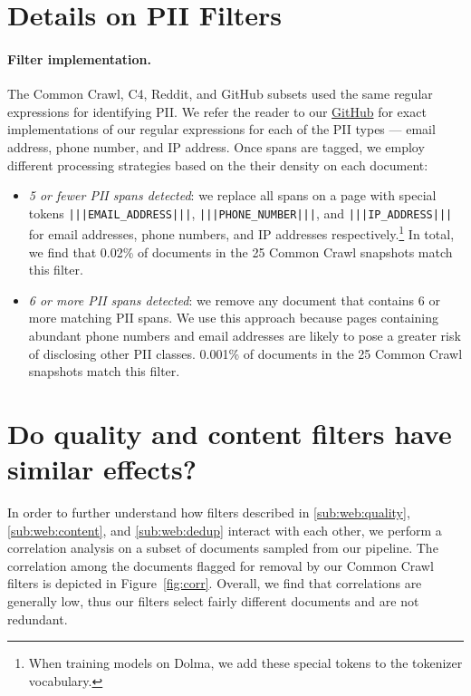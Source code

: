 \documentclass{article}
\newcommand{\dolma}{Dolma\xspace}
\begin{document}
\section{Details on PII Filters}
\label{app:pii-filter-details}

\paragraph{Filter implementation.} The Common Crawl, C4, Reddit, and GitHub subsets used the same regular expressions for identifying PII.
We refer the reader to our \href{https://anonymous.4open.science/r/dolma-55C2/}{GitHub} for exact implementations of our regular expressions for each of the PII types --- email address, phone number, and IP address.
Once spans are tagged, we employ different processing strategies based on the their density on each document:
\begin{itemize}[leftmargin=1em,itemsep=1mm,topsep=1mm]
    \item \textit{5 or fewer PII spans detected}: 
    we replace all spans on a page with special tokens \texttt{|\negthickspace|\negthickspace|EMAIL\_ADDRESS|\negthickspace|\negthickspace|}, \texttt{|\negthickspace|\negthickspace|PHONE\_NUMBER|\negthickspace|\negthickspace|}, and \texttt{|\negthickspace|\negthickspace|IP\_ADDRESS|\negthickspace|\negthickspace|} for email addresses, phone numbers, and IP addresses respectively.\footnote{When training models on \dolma, we add these special tokens to the tokenizer vocabulary.}
    In total, we find that 0.02\% of documents in the 25 Common Crawl snapshots match this filter. 
    \item \textit{6 or more PII spans detected}: 
    we remove any document that contains 6 or more matching PII spans. 
    We use this approach because pages containing abundant phone numbers and email addresses are likely to pose a greater risk of disclosing other PII classes. 
    0.001\% of documents in the 25 Common Crawl snapshots match this filter.
\end{itemize}

\section{Do quality and content filters have similar effects?}
\label{sec:quality-content-correlation}

In order to further understand how filters described in \autoref{sub:web:quality}, \autoref{sub:web:content}, and \autoref{sub:web:dedup} interact with each other, we perform a correlation analysis on a subset of documents sampled from our pipeline. 
The correlation among the documents flagged for removal by our Common Crawl filters is depicted in Figure~\ref{fig:corr}.
Overall, we find that correlations are generally low, thus our filters select fairly different documents and are not redundant. 
\end{document}
